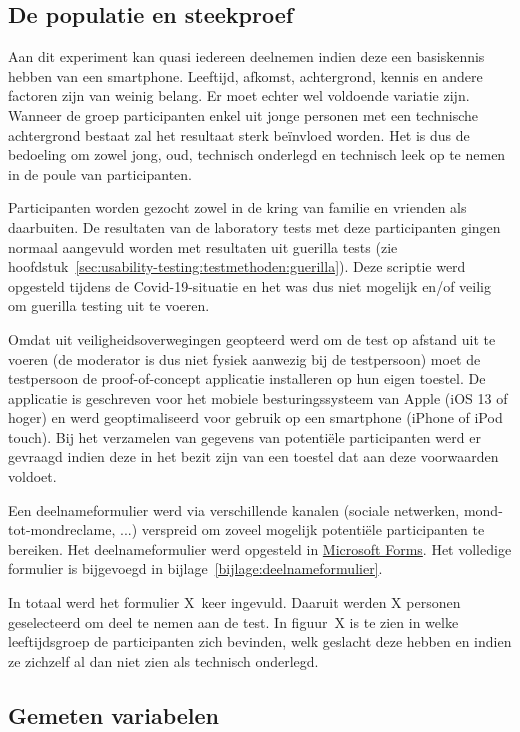 \subsection{De populatie en steekproef}
\label{sec:experiment:populatie-steekproef}

Aan dit experiment kan quasi iedereen deelnemen indien deze een basiskennis hebben van een smartphone. Leeftijd, afkomst, achtergrond, kennis en andere factoren zijn van weinig belang. Er moet echter wel voldoende variatie zijn. Wanneer de groep participanten enkel uit jonge personen met een technische achtergrond bestaat zal het resultaat sterk beïnvloed worden. Het is dus de bedoeling om zowel jong, oud, technisch onderlegd en technisch leek op te nemen in de poule van participanten.

Participanten worden gezocht zowel in de kring van familie en vrienden als daarbuiten. De resultaten van de laboratory tests met deze participanten gingen normaal aangevuld worden met resultaten uit guerilla tests (zie hoofdstuk~\ref{sec:usability-testing:testmethoden:guerilla}). Deze scriptie werd opgesteld tijdens de Covid-19-situatie en het was dus niet mogelijk en/of veilig om guerilla testing uit te voeren.

Omdat uit veiligheidsoverwegingen geopteerd werd om de test op afstand uit te voeren (de moderator is dus niet fysiek aanwezig bij de testpersoon) moet de testpersoon de proof-of-concept applicatie installeren op hun eigen toestel. De applicatie is geschreven voor het mobiele besturingssysteem van Apple (iOS 13 of hoger) en werd geoptimaliseerd voor gebruik op een smartphone (iPhone of iPod touch). Bij het verzamelen van gegevens van potentiële participanten werd er gevraagd indien deze in het bezit zijn van een toestel dat aan deze voorwaarden voldoet.

Een deelnameformulier werd via verschillende kanalen (sociale netwerken, mond-tot-mondreclame, ...) verspreid om zoveel mogelijk potentiële participanten te bereiken. Het deelnameformulier werd opgesteld in \href{https://forms.office.com/}{Microsoft Forms}. Het volledige formulier is bijgevoegd in bijlage~\ref{bijlage:deelnameformulier}.

In totaal werd het formulier X~keer ingevuld. Daaruit werden X personen geselecteerd om deel te nemen aan de test. In figuur~X is te zien in welke leeftijdsgroep de participanten zich bevinden, welk geslacht deze hebben en indien ze zichzelf al dan niet zien als technisch onderlegd.

\subsection{Gemeten variabelen}
\label{sec:experiment:variabelen}

